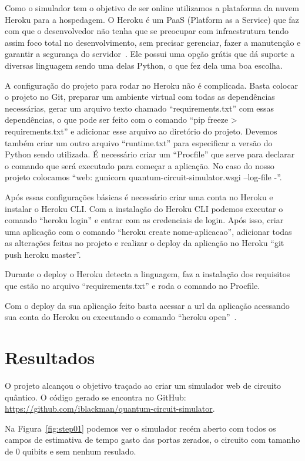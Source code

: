 \documentclass[a4paper, 12pt, oneside]{book}
\begin{document}
Como o simulador tem o objetivo de ser online utilizamos a plataforma da nuvem Heroku para a hospedagem. O Heroku é um PaaS (Platform as a Service) que faz com que o desenvolvedor não tenha que se preocupar com infraestrutura tendo assim foco total no desenvolvimento, sem precisar gerenciar, fazer a manutenção e garantir a segurança do servidor~\cite{heroku}. Ele possui uma opção grátis que dá suporte a diversas linguagem sendo uma delas Python, o que fez dela uma boa escolha.

A configuração do projeto para rodar no Heroku não é complicada. Basta colocar o projeto no Git, preparar um ambiente virtual com todas as dependências necessárias, gerar um arquivo texto chamado ``requirements.txt'' com essas dependências, o que pode ser feito com o comando ``pip freeze > requirements.txt'' e adicionar esse arquivo ao diretório do projeto. Devemos também criar um outro arquivo ``runtime.txt'' para especificar a versão do Python sendo utilizada. É necessário criar um ``Procfile'' que serve para declarar o comando que será executado para começar a aplicação. No caso do nosso projeto colocamos ``web: gunicorn quantum-circuit-simulator.wsgi --log-file -''.

Após essas configurações básicas é necessário criar uma conta no Heroku e instalar o Heroku CLI. Com a instalação do Heroku CLI podemos executar o comando ``heroku login'' e entrar com as credenciais de login. Após isso, criar uma aplicação com o comando ``heroku create nome-aplicacao'', adicionar todas as alterações feitas no projeto e realizar o deploy da aplicação no Heroku ``git push heroku master''.

Durante o deploy o Heroku detecta a linguagem, faz a instalação dos requisitos que estão no arquivo ``requirements.txt'' e roda o comando no Procfile.

Com o deploy da sua aplicação feito basta acessar a url da aplicação acessando sua conta do Heroku ou executando o comando ``heroku open''~\cite{heroku-python}.

\section{Resultados}

O projeto alcançou o objetivo traçado ao criar um simulador web de circuito quântico. O código gerado se encontra no GitHub: \url{https://github.com/iblackman/quantum-circuit-simulator}.

Na Figura~\ref{fig:step01} podemos ver o simulador recém aberto com todos os campos de estimativa de tempo gasto das portas zerados, o circuito com tamanho de 0 quibits e sem nenhum resulado.
\end{document}
